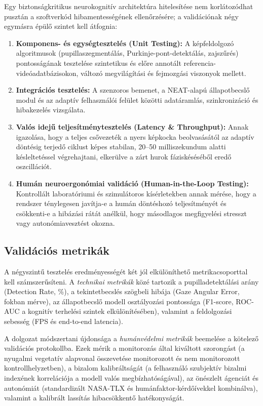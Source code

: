 \documentclass[12pt,a4paper,oneside]{book}
\begin{document}
Egy biztonságkritikus neurokognitív architektúra hitelesítése nem korlátozódhat pusztán a szoftverkód hibamentességének ellenőrzésére; a validációnak négy egymásra épülő szintet kell átfognia:
\begin{enumerate}
    \item \textbf{Komponens- és egységtesztelés (Unit Testing):} A képfeldolgozó algoritmusok (pupillaszegmentálás, Purkinje-pont-detektálás, zajszűrés) pontosságának tesztelése szintetikus és előre annotált referencia-videóadatbázisokon, változó megvilágítási és fejmozgási viszonyok mellett.
    \item \textbf{Integrációs tesztelés:} A szenzoros bemenet, a NEAT-alapú állapotbecslő modul és az adaptív felhasználói felület közötti adatáramlás, szinkronizáció és hibakezelés vizsgálata.
    \item \textbf{Valós idejű teljesítménytesztelés (Latency \& Throughput):} Annak igazolása, hogy a teljes csővezeték a nyers képkocka beolvasásától az adaptív döntésig terjedő ciklust képes stabilan, 20--50 milliszekundum alatti késleltetéssel végrehajtani, elkerülve a zárt hurok fáziskéséséből eredő oszcillációt.
    \item \textbf{Humán neuroergonómiai validáció (Human-in-the-Loop Testing):} Kontrollált laboratóriumi és szimulátoros kísérletekben annak mérése, hogy a rendszer ténylegesen javítja-e a humán döntéshozó teljesítményét és csökkenti-e a hibázási rátát anélkül, hogy másodlagos megfigyelési stresszt vagy autonómiavesztést okozna.
\end{enumerate}

\subsection{Validációs metrikák}

A négyszintű tesztelés eredményességét két jól elkülöníthető metrikacsoporttal kell számszerűsíteni. A \emph{technikai metrikák} közé tartozik a pupilladetektálási arány (Detection Rate, \%), a tekintetbecslés szögbeli hibája (Gaze Angular Error, fokban mérve), az állapotbecslő modell osztályozási pontossága (F1-score, ROC-AUC a kognitív terhelési szintek elkülönítésében), valamint a feldolgozási sebesség (FPS és end-to-end latencia). 

A dolgozat módszertani újdonsága a \emph{humánvédelmi metrikák} beemelése a kötelező validációs protokollba. Ezek mérik a monitorozás által kiváltott szorongást (a nyugalmi vegetatív alapvonal összevetése monitorozott és nem monitorozott kontrollhelyzetben), a bizalom kalibráltságát (a felhasználó szubjektív bizalmi indexének korrelációja a modell valós megbízhatóságával), az önészlelt ágenciát és autonómiát (standardizált NASA-TLX és humánfaktor-kérdőívekkel kombinálva), valamint a kalibrált lassítás hibacsökkentő hatékonyságát.
\end{document}
